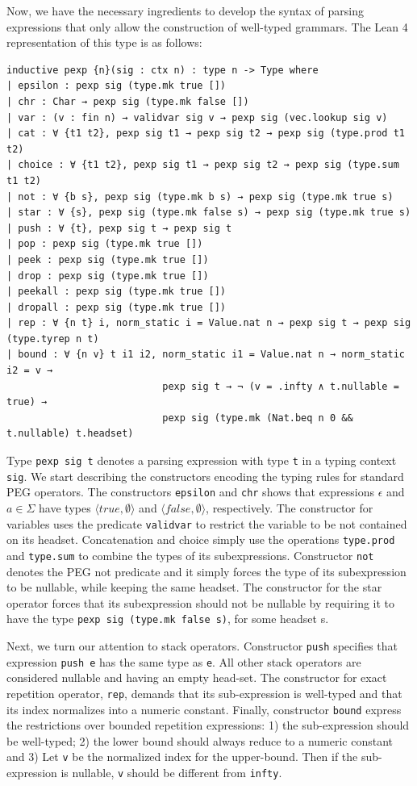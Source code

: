 \documentclass[preprint,12pt]{elsarticle}
\theoremstyle{definition}
\begin{document}
Now, we have the necessary ingredients to develop the syntax of parsing expressions
that only allow the construction of well-typed grammars. The Lean 4 representation of
this type is as follows:
\begin{lstlisting}
inductive pexp {n}(sig : ctx n) : type n -> Type where
| epsilon : pexp sig (type.mk true [])
| chr : Char → pexp sig (type.mk false [])
| var : (v : fin n) → validvar sig v → pexp sig (vec.lookup sig v)
| cat : ∀ {t1 t2}, pexp sig t1 → pexp sig t2 → pexp sig (type.prod t1 t2)
| choice : ∀ {t1 t2}, pexp sig t1 → pexp sig t2 → pexp sig (type.sum t1 t2)
| not : ∀ {b s}, pexp sig (type.mk b s) → pexp sig (type.mk true s)
| star : ∀ {s}, pexp sig (type.mk false s) → pexp sig (type.mk true s)
| push : ∀ {t}, pexp sig t → pexp sig t
| pop : pexp sig (type.mk true [])
| peek : pexp sig (type.mk true [])
| drop : pexp sig (type.mk true [])
| peekall : pexp sig (type.mk true [])
| dropall : pexp sig (type.mk true [])
| rep : ∀ {n t} i, norm_static i = Value.nat n → pexp sig t → pexp sig (type.tyrep n t)
| bound : ∀ {n v} t i1 i2, norm_static i1 = Value.nat n → norm_static i2 = v →
                           pexp sig t → ¬ (v = .infty ∧ t.nullable = true) →
                           pexp sig (type.mk (Nat.beq n 0 && t.nullable) t.headset)
\end{lstlisting}
Type \lstinline|pexp sig t| denotes a parsing expression with type \lstinline|t|
in a typing context \lstinline|sig|. We start describing the constructors encoding
the typing rules for standard PEG operators. The constructors \lstinline|epsilon|
and \lstinline|chr| shows that expressions $\epsilon$ and $a \in \Sigma$
have types $\langle true, \emptyset \rangle$ and $\langle false, \emptyset\rangle$,
respectively. The constructor for variables uses the predicate \lstinline|validvar| to
restrict the variable to be not contained on its headset. Concatenation and choice
simply use the operations \lstinline|type.prod| and \lstinline|type.sum| to combine
the types of its subexpressions. Constructor \lstinline|not| denotes the PEG not
predicate and it simply forces the type of its subexpression to be nullable, while
keeping the same headset. The constructor for the star operator forces that its
subexpression should not be nullable by requiring it to have the type
\lstinline|pexp sig (type.mk false s)|, for some headset s.

Next, we turn our attention to stack operators. Constructor \lstinline|push| specifies
that expression \lstinline|push e| has the same type as \lstinline|e|. All other
stack operators are considered nullable and having an empty head-set. The constructor
for exact repetition operator, \lstinline|rep|, demands that its sub-expression is
well-typed and that its index normalizes into a numeric constant. Finally, constructor
\lstinline|bound| express the restrictions over bounded repetition expressions:
1) the sub-expression should be well-typed; 2) the lower bound should always reduce
to a numeric constant and 3) Let \lstinline|v| be the normalized index for the upper-bound.
Then if the sub-expression is nullable, \lstinline|v| should be different from
\lstinline|infty|.
\end{document}
